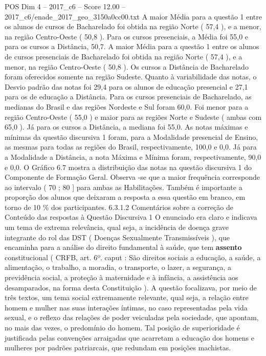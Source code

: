 \begin{textsample}{POS Dim 4 – 2017\_c6 – Score 12.00 – 2017\_c6/enade\_2017\_geo\_3150a0cc00.txt}
A maior Média para a questão 1 entre os alunos de cursos de Bacharelado foi obtida na região Norte ( 57,4 ), e a menor, na região Centro-Oeste ( 50,8 ).
Para os cursos presenciais, a Média foi 55,0 e para os cursos a Distância, 50,7.
A maior Média para a questão 1 entre os alunos de cursos presenciais de Bacharelado foi obtida na região Norte ( 57,4 ), e a menor, na região Centro-Oeste ( 50,8 ).
Os cursos a Distância de Bacharelado foram oferecidos somente na região Sudeste.
Quanto à variabilidade das notas, o Desvio padrão das notas foi 29,4 para os alunos de educação presencial e 27,1 para os de educação a Distância.
Para os cursos presenciais de Bacharelado, as medianas do Brasil e das regiões Nordeste e Sul foram 60,0.
Foi menor para a região Centro-Oeste ( 55,0 ) e maior para as regiões Norte e Sudeste ( ambas com 65,0 ).
Já para os cursos a Distância, a mediana foi 55,0.
As notas máximas e mínimas da questão discursiva 1 foram, para a Modalidade presencial de Ensino, as mesmas para todas as regiões do Brasil, respectivamente, 100,0 e 0,0.
Já para a Modalidade a Distância, a nota Máxima e Mínima foram, respectivamente, 90,0 e 0,0.
O Gráfico 6.7 mostra a distribuição das notas na questão discursiva 1 do Componente de Formação Geral.
Observa -se que a maior frequência corresponde ao intervalo ( 70 ; 80 ] para ambas as Habilitações.
Também é importante a proporção dos alunos que deixaram a resposta a essa questão em branco, em torno de 10 \% dos participantes. 6.3.1.2 Comentários sobre a correção de Conteúdo das respostas à Questão Discursiva 1 O enunciado era claro e indicava um tema de extrema relevância, qual seja, a incidência de doença grave integrante do rol das DST ( Doenças Sexualmente Transmissíveis ), que encaminha para a análise do direito fundamental à saúde, que tem \textbf{assento} constitucional ( CRFB, art. 6º. caput : São direitos sociais a educação, a saúde, a alimentação, o trabalho, a moradia, o transporte, o lazer, a segurança, a previdência social, a proteção à maternidade e à infância, a assistência aos desamparados, na forma desta Constituição ).
A questão focalizava, por meio de três textos, um tema social extremamente relevante, qual seja, a relação entre homem e mulher nas suas interações íntimas, no caso representadas pela vida sexual, e o reflexo das relações de poder veiculadas pela sociedade, que apontam, no mais das vezes, o predomínio do homem.
Tal posição de superioridade é justificada pelas convenções arraigadas que acarretam a educação dos homens e mulheres por padrões patriarcais, que redundam em posições machistas.

\end{textsample}

